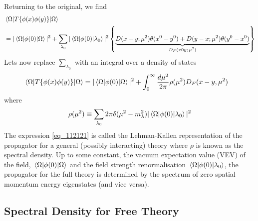 Returning to the original, we find
\begin{align}
    & \mel{\Omega}{  T\{ \phi(x) \phi(y) \} }{\Omega} \nonumber\\
    & = |\mel{\Omega}{  \phi(0) }{\Omega}|^2 +  \sum_{\lambda_0}   |\mel{\Omega}{ \phi(0) }{\lambda_0}|^2 \left\{ \underbrace{    D(x - y; \mu^2) \theta (x^0 - y^0) +  D(y - x; \mu^2) \theta (y^0 - x^0) }_\text{$D_F(x 0 y; \mu^2)$}  \right\}
\end{align}
Lets now replace $\sum_{\lambda_0}$ with an integral over a density of states
\begin{align}\label{eq_112121}
    & \mel{\Omega}{  T\{ \phi(x) \phi(y) \} }{\Omega} = |\mel{\Omega}{  \phi(0) }{\Omega}|^2 + \int_{0}^{\infty} \frac{d\mu^2}{2\pi} \rho(\mu^2) D_F (x - y, \mu^2)
\end{align}
where
\begin{equation}
    \rho(\mu^2) \equiv \sum_{\lambda_0} 2\pi \delta (\mu^2 - m_{\lambda}^2) |\mel{\Omega}{  \phi(0) }{\lambda_0}|^2 
\end{equation}
The expression \eqref{eq_112121} is called the Lehman-Kallen representation of the propagator for a general (possibly interacting) theory where $\rho$ is known as the spectral density. Up to some constant, the vacuum expectation value (VEV) of the field, $\mel{\Omega}{\phi(0)}{\Omega}$ and the field strength renormalisation $\mel{\Omega}{\phi(0)}{\lambda_0}$, the propagator for the full theory is determined by the spectrum of zero spatial momentum energy eigenstates (and vice versa).

\subsection{Spectral Density for Free Theory}

